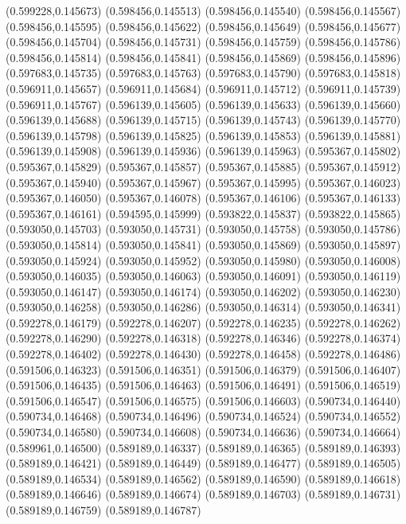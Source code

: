 (0.599228,0.145673)
(0.598456,0.145513)
(0.598456,0.145540)
(0.598456,0.145567)
(0.598456,0.145595)
(0.598456,0.145622)
(0.598456,0.145649)
(0.598456,0.145677)
(0.598456,0.145704)
(0.598456,0.145731)
(0.598456,0.145759)
(0.598456,0.145786)
(0.598456,0.145814)
(0.598456,0.145841)
(0.598456,0.145869)
(0.598456,0.145896)
(0.597683,0.145735)
(0.597683,0.145763)
(0.597683,0.145790)
(0.597683,0.145818)
(0.596911,0.145657)
(0.596911,0.145684)
(0.596911,0.145712)
(0.596911,0.145739)
(0.596911,0.145767)
(0.596139,0.145605)
(0.596139,0.145633)
(0.596139,0.145660)
(0.596139,0.145688)
(0.596139,0.145715)
(0.596139,0.145743)
(0.596139,0.145770)
(0.596139,0.145798)
(0.596139,0.145825)
(0.596139,0.145853)
(0.596139,0.145881)
(0.596139,0.145908)
(0.596139,0.145936)
(0.596139,0.145963)
(0.595367,0.145802)
(0.595367,0.145829)
(0.595367,0.145857)
(0.595367,0.145885)
(0.595367,0.145912)
(0.595367,0.145940)
(0.595367,0.145967)
(0.595367,0.145995)
(0.595367,0.146023)
(0.595367,0.146050)
(0.595367,0.146078)
(0.595367,0.146106)
(0.595367,0.146133)
(0.595367,0.146161)
(0.594595,0.145999)
(0.593822,0.145837)
(0.593822,0.145865)
(0.593050,0.145703)
(0.593050,0.145731)
(0.593050,0.145758)
(0.593050,0.145786)
(0.593050,0.145814)
(0.593050,0.145841)
(0.593050,0.145869)
(0.593050,0.145897)
(0.593050,0.145924)
(0.593050,0.145952)
(0.593050,0.145980)
(0.593050,0.146008)
(0.593050,0.146035)
(0.593050,0.146063)
(0.593050,0.146091)
(0.593050,0.146119)
(0.593050,0.146147)
(0.593050,0.146174)
(0.593050,0.146202)
(0.593050,0.146230)
(0.593050,0.146258)
(0.593050,0.146286)
(0.593050,0.146314)
(0.593050,0.146341)
(0.592278,0.146179)
(0.592278,0.146207)
(0.592278,0.146235)
(0.592278,0.146262)
(0.592278,0.146290)
(0.592278,0.146318)
(0.592278,0.146346)
(0.592278,0.146374)
(0.592278,0.146402)
(0.592278,0.146430)
(0.592278,0.146458)
(0.592278,0.146486)
(0.591506,0.146323)
(0.591506,0.146351)
(0.591506,0.146379)
(0.591506,0.146407)
(0.591506,0.146435)
(0.591506,0.146463)
(0.591506,0.146491)
(0.591506,0.146519)
(0.591506,0.146547)
(0.591506,0.146575)
(0.591506,0.146603)
(0.590734,0.146440)
(0.590734,0.146468)
(0.590734,0.146496)
(0.590734,0.146524)
(0.590734,0.146552)
(0.590734,0.146580)
(0.590734,0.146608)
(0.590734,0.146636)
(0.590734,0.146664)
(0.589961,0.146500)
(0.589189,0.146337)
(0.589189,0.146365)
(0.589189,0.146393)
(0.589189,0.146421)
(0.589189,0.146449)
(0.589189,0.146477)
(0.589189,0.146505)
(0.589189,0.146534)
(0.589189,0.146562)
(0.589189,0.146590)
(0.589189,0.146618)
(0.589189,0.146646)
(0.589189,0.146674)
(0.589189,0.146703)
(0.589189,0.146731)
(0.589189,0.146759)
(0.589189,0.146787)
